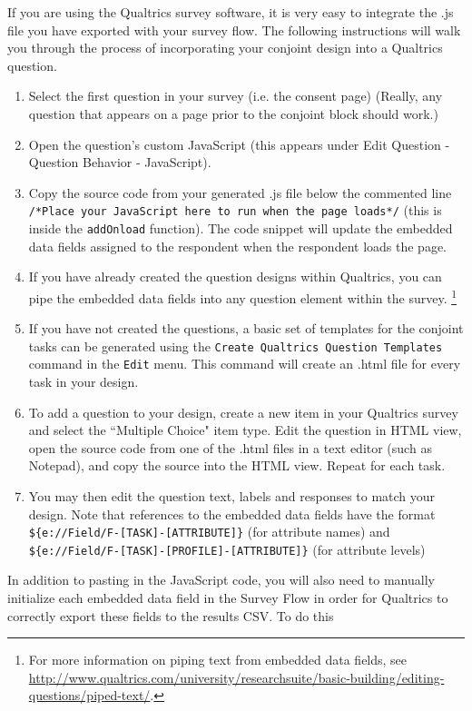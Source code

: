 \documentclass[12pt]{article}
\begin{document}
If you are using the Qualtrics survey software, it is very easy to integrate the .js file you have exported with your survey flow. The following instructions will walk you through the process of incorporating your conjoint design into a Qualtrics question.
\begin{enumerate}
\item Select the first question in your survey (i.e. the consent page) (Really, any question that appears on a page prior to the conjoint block should work.)
\item Open the question's custom JavaScript (this appears under Edit Question - Question Behavior - JavaScript).
\item Copy the source code from your generated .js file below the commented line \texttt{/*Place your JavaScript here to run when the page loads*/} (this is inside the  \texttt{addOnload} function). The code snippet will update the embedded data fields assigned to the respondent when the respondent loads the page.
\item If you have already created the question designs within Qualtrics, you can pipe the embedded data fields into any question element within the survey. \footnote{For more information on piping text from embedded data fields, see \href{http://www.qualtrics.com/university/researchsuite/basic-building/editing-questions/piped-text/}{http://www.qualtrics.com/university/researchsuite/basic-building/editing-questions/piped-text/}.} 
\item If you have not created the questions, a basic set of templates for the conjoint tasks can be generated using the \texttt{Create Qualtrics Question Templates} command in the \texttt{Edit} menu. This command will create an .html file for every task in your design.
\item To add a question to your design, create a new item in your Qualtrics survey and select the ``Multiple Choice" item type. Edit the question in HTML view, open the source code from one of the .html files in a text editor (such as Notepad), and copy the source into the HTML view. Repeat for each task.
\item You may then edit the question text, labels and responses to match your design. Note that references to the embedded data fields have the format \texttt{\$\{e://Field/F-[TASK]-[ATTRIBUTE]\}} (for attribute names) and \texttt{\$\{e://Field/F-[TASK]-[PROFILE]-[ATTRIBUTE]\}} (for attribute levels)
\end{enumerate}

In addition to pasting in the JavaScript code, you will also need to manually initialize each embedded data field in the Survey Flow in order for Qualtrics to correctly export these fields to the results CSV. To do this
\end{document}

